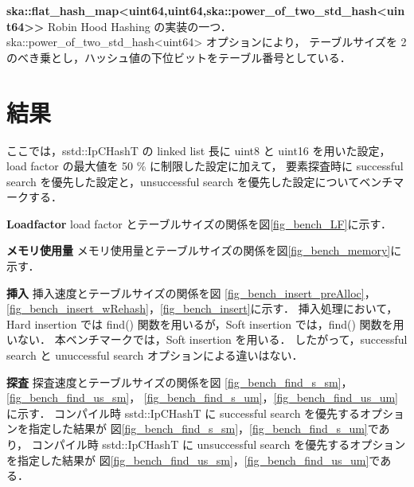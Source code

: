 %
{\bf ska::flat\_hash\_map<uint64,uint64,ska::power\_of\_two\_std\_hash<uint64>>}
\samepage\newline\indent
Robin Hood Hashing の実装の一つ．
ska::power\_of\_two\_std\_hash<uint64> オプションにより，
テーブルサイズを 2 のべき乗とし，ハッシュ値の下位ビットをテーブル番号としている．

\leavevmode \newline


\section{結果}
ここでは，sstd::IpCHashT の linked list 長に uint8 と uint16 を用いた設定，load factor の最大値を 50 \% に制限した設定に加えて，
要素探査時に successful search を優先した設定と，unsuccessful search を優先した設定についてベンチマークする．
\leavevmode \newline

%
{\bf Loadfactor}
\samepage\newline\indent
load factor とテーブルサイズの関係を図\ref{fig_bench_LF}に示す．
\leavevmode \newline

%
{\bf メモリ使用量}
\samepage\newline\indent
メモリ使用量とテーブルサイズの関係を図\ref{fig_bench_memory}に示す．
\leavevmode \newline

%
{\bf 挿入}
\samepage\newline\indent
挿入速度とテーブルサイズの関係を図
\ref{fig_bench_insert_preAlloc}，\ref{fig_bench_insert_wRehash}，\ref{fig_bench_insert}に示す．
挿入処理において，Hard insertion では find() 関数を用いるが，Soft insertion では，find() 関数を用いない．
本ベンチマークでは，Soft insertion を用いる．
したがって，successful search と unuccessful search オプションによる違いはない．
\leavevmode \newline

%
{\bf 探査}
\samepage\newline\indent
探査速度とテーブルサイズの関係を図
\ref{fig_bench_find_s_sm}，\ref{fig_bench_find_us_sm}，
\ref{fig_bench_find_s_um}，\ref{fig_bench_find_us_um}に示す．
コンパイル時 sstd::IpCHashT に successful search を優先するオプションを指定した結果が
図\ref{fig_bench_find_s_sm}，\ref{fig_bench_find_s_um}であり，
コンパイル時 sstd::IpCHashT に unsuccessful search を優先するオプションを指定した結果が
図\ref{fig_bench_find_us_sm}，\ref{fig_bench_find_us_um}である．
\leavevmode \newline

